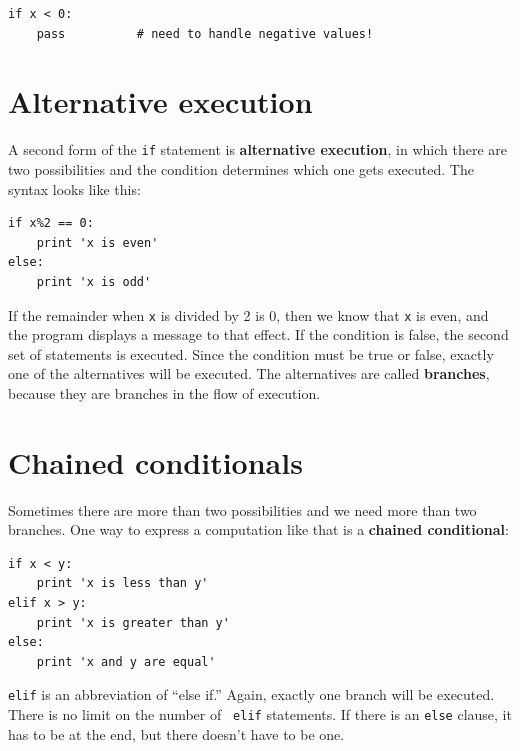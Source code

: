 \documentclass[10pt]{book}
\begin{document}

\beforeverb
\begin{verbatim}
if x < 0:
    pass          # need to handle negative values!
\end{verbatim}
\afterverb
%

\section{Alternative execution}
\label{alternative execution}


A second form of the {\tt if} statement is {\bf alternative execution},
in which there are two possibilities and the condition determines
which one gets executed.  The syntax looks like this:

\beforeverb
\begin{verbatim}
if x%2 == 0:
    print 'x is even'
else:
    print 'x is odd'
\end{verbatim}
\afterverb
%
If the remainder when {\tt x} is divided by 2 is 0, then we
know that {\tt x} is even, and the program displays a message to that
effect.  If the condition is false, the second set of statements is
executed.  Since the condition must be true or false, exactly one of
the alternatives will be executed.  The alternatives are called
{\bf branches}, because they are branches in the flow of execution.




\section{Chained conditionals}

Sometimes there are more than two possibilities and we need more than
two branches.  One way to express a computation like that is a {\bf
chained conditional}:

\beforeverb
\begin{verbatim}
if x < y:
    print 'x is less than y'
elif x > y:
    print 'x is greater than y'
else:
    print 'x and y are equal'
\end{verbatim}
\afterverb
%
{\tt elif} is an abbreviation of ``else if.''  Again, exactly one
branch will be executed.  There is no limit on the number of {\tt
elif} statements.  If there is an {\tt else} clause, it has to be
at the end, but there doesn't have to be one.
\end{document}
